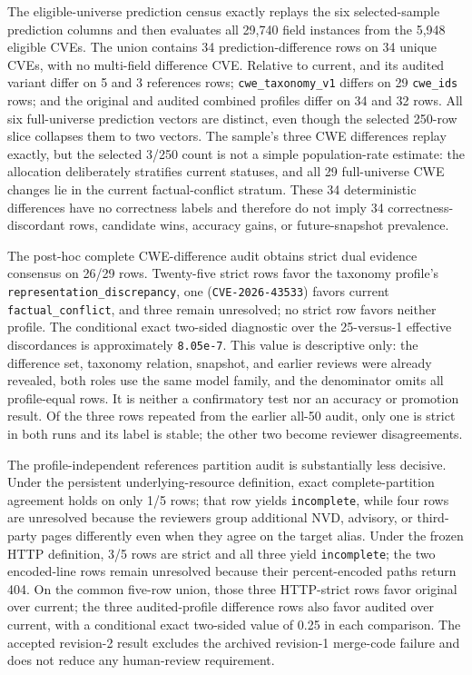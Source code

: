 The eligible-universe prediction census exactly replays the six selected-sample prediction columns and then evaluates all 29,740 field instances from the 5,948 eligible CVEs. The union contains 34 prediction-difference rows on 34 unique CVEs, with no multi-field difference CVE. Relative to current,  and its audited variant differ on 5 and 3 references rows; \texttt{cwe\_taxonomy\_v1} differs on 29 \texttt{cwe\_ids} rows; and the original and audited combined profiles differ on 34 and 32 rows. All six full-universe prediction vectors are distinct, even though the selected 250-row slice collapses them to two vectors. The sample's three CWE differences replay exactly, but the selected 3/250 count is not a simple population-rate estimate: the allocation deliberately stratifies current statuses, and all 29 full-universe CWE changes lie in the current factual-conflict stratum. These 34 deterministic differences have no correctness labels and therefore do not imply 34 correctness-discordant rows, candidate wins, accuracy gains, or future-snapshot prevalence.

The post-hoc complete CWE-difference audit obtains strict dual evidence consensus on 26/29 rows. Twenty-five strict rows favor the taxonomy profile's \texttt{representation\_discrepancy}, one (\texttt{CVE-2026-43533}) favors current \texttt{factual\_conflict}, and three remain unresolved; no strict row favors neither profile. The conditional exact two-sided diagnostic over the 25-versus-1 effective discordances is approximately \texttt{8.05e-7}. This value is descriptive only: the difference set, taxonomy relation, snapshot, and earlier reviews were already revealed, both roles use the same model family, and the denominator omits all profile-equal rows. It is neither a confirmatory test nor an accuracy or promotion result. Of the three rows repeated from the earlier all-50 audit, only one is strict in both runs and its label is stable; the other two become reviewer disagreements.

The profile-independent references partition audit is substantially less decisive. Under the persistent underlying-resource definition, exact complete-partition agreement holds on only 1/5 rows; that row yields \texttt{incomplete}, while four rows are unresolved because the reviewers group additional NVD, advisory, or third-party pages differently even when they agree on the target alias. Under the frozen HTTP definition, 3/5 rows are strict and all three yield \texttt{incomplete}; the two encoded-line rows remain unresolved because their percent-encoded paths return 404. On the common five-row union, those three HTTP-strict rows favor original over current; the three audited-profile difference rows also favor audited over current, with a conditional exact two-sided value of 0.25 in each comparison. The accepted revision-2 result excludes the archived revision-1 merge-code failure and does not reduce any human-review requirement.

